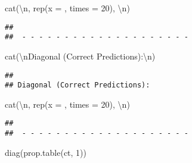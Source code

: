 \documentclass[
]{article}
\newenvironment{Shaded}{\begin{snugshade}}{\end{snugshade}}
\newcommand{\AttributeTok}[1]{\textcolor[rgb]{0.77,0.63,0.00}{#1}}
\newcommand{\DecValTok}[1]{\textcolor[rgb]{0.00,0.00,0.81}{#1}}
\newcommand{\FunctionTok}[1]{\textcolor[rgb]{0.00,0.00,0.00}{#1}}
\newcommand{\NormalTok}[1]{#1}
\newcommand{\SpecialCharTok}[1]{\textcolor[rgb]{0.00,0.00,0.00}{#1}}
\newcommand{\StringTok}[1]{\textcolor[rgb]{0.31,0.60,0.02}{#1}}
\begin{document}
\begin{Shaded}
\begin{Highlighting}[]
\FunctionTok{cat}\NormalTok{(}\StringTok{\textquotesingle{}}\SpecialCharTok{\textbackslash{}n}\StringTok{\textquotesingle{}}\NormalTok{, }\FunctionTok{rep}\NormalTok{(}\AttributeTok{x =} \StringTok{\textquotesingle{}{-}\textquotesingle{}}\NormalTok{, }\AttributeTok{times =} \DecValTok{20}\NormalTok{), }\StringTok{\textquotesingle{}}\SpecialCharTok{\textbackslash{}n}\StringTok{\textquotesingle{}}\NormalTok{)}
\end{Highlighting}
\end{Shaded}

\begin{verbatim}
## 
##  - - - - - - - - - - - - - - - - - - - -
\end{verbatim}

\begin{Shaded}
\begin{Highlighting}[]
\FunctionTok{cat}\NormalTok{(}\StringTok{\textquotesingle{}}\SpecialCharTok{\textbackslash{}n}\StringTok{Diagonal (Correct Predictions):}\SpecialCharTok{\textbackslash{}n}\StringTok{\textquotesingle{}}\NormalTok{)}
\end{Highlighting}
\end{Shaded}

\begin{verbatim}
## 
## Diagonal (Correct Predictions):
\end{verbatim}

\begin{Shaded}
\begin{Highlighting}[]
\FunctionTok{cat}\NormalTok{(}\StringTok{\textquotesingle{}}\SpecialCharTok{\textbackslash{}n}\StringTok{\textquotesingle{}}\NormalTok{, }\FunctionTok{rep}\NormalTok{(}\AttributeTok{x =} \StringTok{\textquotesingle{}{-}\textquotesingle{}}\NormalTok{, }\AttributeTok{times =} \DecValTok{20}\NormalTok{), }\StringTok{\textquotesingle{}}\SpecialCharTok{\textbackslash{}n}\StringTok{\textquotesingle{}}\NormalTok{)}
\end{Highlighting}
\end{Shaded}

\begin{verbatim}
## 
##  - - - - - - - - - - - - - - - - - - - -
\end{verbatim}

\begin{Shaded}
\begin{Highlighting}[]
\FunctionTok{diag}\NormalTok{(}\FunctionTok{prop.table}\NormalTok{(ct, }\DecValTok{1}\NormalTok{))}
\end{Highlighting}
\end{Shaded}
\end{document}
